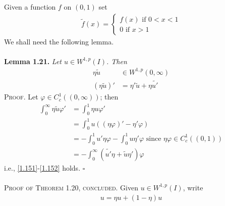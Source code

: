 \documentclass[a4paper,oneside]{book}
\numberwithin{equation}{chapter}
\begin{document}
Given a function $f$ on $\left(0,1\right)$ set
\begin{align}
\label{1.151}
\tilde f\left( x \right) = \left\{ {\begin{array}{*{20}{c}}
{f\left( x \right)\mbox{ if } 0 < x < 1}\\
{0\mbox{ if } x > 1}
\end{array}} \right.
\end{align}
We shall need the following lemma.\\
\\
\textbf{Lemma 1.21.} \textit{Let $u \in W^{1,p}\left(I\right)$. Then}
\begin{align}
\label{1.151}
\eta \tilde u &\in {W^{1,p}}\left( {0,\infty } \right)\\
\left( {\eta \tilde u} \right)' &= \eta '\tilde u + \eta \widetilde {u'} \label{1.152}
\end{align}
\textsc{Proof.} Let $\varphi  \in C_c^1\left( {\left( {0,\infty } \right)} \right)$; then
\begin{align}
\int_0^\infty  {\eta \tilde u\varphi '}  &= \int_0^1 {\eta u\varphi '} \\
& = \int_0^1 {u\left( {\left( {\eta \varphi } \right)' - \eta '\varphi } \right)} \\
& =  - \int_0^1 {u'\eta \varphi }  - \int_0^1 {u\eta '\varphi } \mbox{ since } \eta \varphi \in C_c^1\left( {\left( {0,1} \right)} \right)\\
& =  - \int_0^\infty  {\left( {\widetilde {u'}\eta  + \tilde u\eta '} \right)\varphi } 
\end{align}
i.e., \eqref{1.151}-\eqref{1.152} holds. \hfill $\square$\\
\\
\textsc{Proof of Theorem 1.20, concluded.} Given $u\in W^{1,p}\left(I\right)$, write
\begin{align}
u = \eta u + \left( {1 - \eta } \right)u
\end{align}
\end{document}
